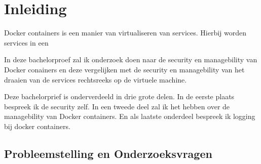 \chapter{Inleiding}
\label{ch:inleiding}

Docker containers is een manier van virtualiseren van services. Hierbij worden services in een 

In deze bachelorproef zal ik onderzoek doen naar de security en managebility van Docker conainers en deze vergelijken met de security en managebility van het draaien van de services rechtsreeks op de virtuele machine.

Deze bachelorprief is onderverdeeld in drie grote delen. In de eerste plaats bespreek ik de security zelf. In een tweede deel zal ik het hebben over de managebility van Docker containers. En als laatste onderdeel bespreek ik logging bij docker containers.

\section{Probleemstelling en Onderzoeksvragen}
\label{sec:onderzoeksvragen}

